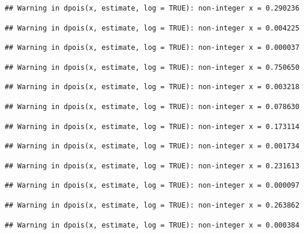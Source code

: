 \documentclass[]{article}
\begin{document}
\begin{verbatim}
## Warning in dpois(x, estimate, log = TRUE): non-integer x = 0.290236
\end{verbatim}

\begin{verbatim}
## Warning in dpois(x, estimate, log = TRUE): non-integer x = 0.004225
\end{verbatim}

\begin{verbatim}
## Warning in dpois(x, estimate, log = TRUE): non-integer x = 0.000037
\end{verbatim}

\begin{verbatim}
## Warning in dpois(x, estimate, log = TRUE): non-integer x = 0.750650
\end{verbatim}

\begin{verbatim}
## Warning in dpois(x, estimate, log = TRUE): non-integer x = 0.003218
\end{verbatim}

\begin{verbatim}
## Warning in dpois(x, estimate, log = TRUE): non-integer x = 0.078630
\end{verbatim}

\begin{verbatim}
## Warning in dpois(x, estimate, log = TRUE): non-integer x = 0.173114
\end{verbatim}

\begin{verbatim}
## Warning in dpois(x, estimate, log = TRUE): non-integer x = 0.001734
\end{verbatim}

\begin{verbatim}
## Warning in dpois(x, estimate, log = TRUE): non-integer x = 0.231613
\end{verbatim}

\begin{verbatim}
## Warning in dpois(x, estimate, log = TRUE): non-integer x = 0.000097
\end{verbatim}

\begin{verbatim}
## Warning in dpois(x, estimate, log = TRUE): non-integer x = 0.263862
\end{verbatim}

\begin{verbatim}
## Warning in dpois(x, estimate, log = TRUE): non-integer x = 0.000384
\end{verbatim}
\end{document}
